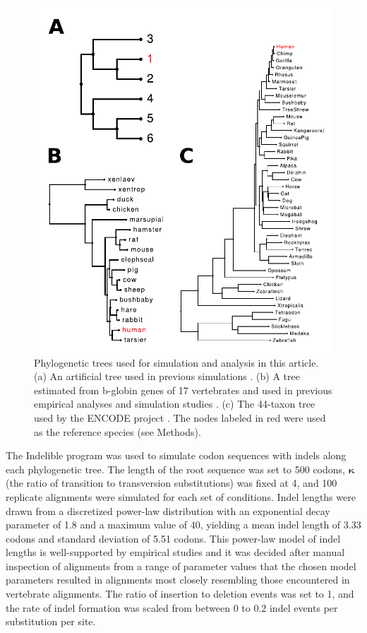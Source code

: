 \documentclass{mbe}
\begin{document}
\begin{figure}[h]
\begin{center}
\includegraphics[scale=0.5]{fig1.pdf}
\end{center}
\caption{Phylogenetic trees used for simulation and analysis in this
  article. (a) An artificial tree used in previous simulations
  \citep{Anisimova2001Accuracy,Massingham2005Detecting}. (b) A tree
  estimated from b-globin genes of 17 vertebrates and used in previous
  empirical analyses and simulation studies
  \citep{Anisimova2001Accuracy,Anisimova2002Accuracy}. (c) The
  44-taxon tree used by the ENCODE project
  \citep{2007Identification,Nikolaev2007Early}. The nodes labeled in
  red were used as the reference species (see Methods).}
\label{fig_1}
\end{figure}

The Indelible program \citep{Fletcher2009INDELible} was used to
simulate codon sequences with indels along each phylogenetic tree. The
length of the root sequence was set to 500 codons, $\bm{\kappa}$ (the
ratio of transition to transversion substitutions) was fixed at 4, and
100 replicate alignments were simulated for each set of
conditions. Indel lengths were drawn from a discretized power-law
distribution with an exponential decay parameter of 1.8 and a maximum
value of 40, yielding a mean indel length of 3.33 codons and standard
deviation of 5.51 codons. This power-law model of indel lengths is
well-supported by empirical studies
\citep{Benner1993Empirical,Cartwright2009Problems} and it was decided
after manual inspection of alignments from a range of parameter values
that the chosen model parameters resulted in alignments most closely
resembling those encountered in vertebrate alignments. The ratio of
insertion to deletion events was set to 1, and the rate of indel
formation was scaled from between 0 to 0.2 indel events per
substitution per site.
\end{document}
